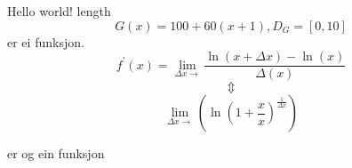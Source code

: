\documentclass{article}
\begin{document}
Hello world! length 
$$ G(x) = 100 + 60(x+1), D_{G} = [0,10]$$
er ei funksjon.
$$ 
	f^{'}(x) = \lim_{\Delta x \rightarrow }\frac{\ln(x+ \Delta x) -\ln(x)}{\Delta(x)}
$$
$$ \Updownarrow 
$$
$$
	\lim_{\Delta x \rightarrow }\left(\ln\left(1+\frac{x}{x}\right)^{\frac{1}{\Delta x}}\right)
$$

er og ein funksjon
\end{document}
